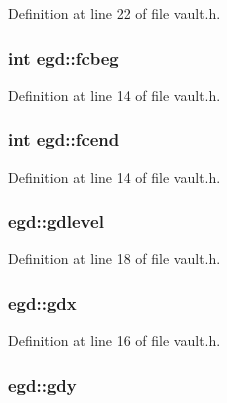 Definition at line 22 of file vault.\+h.

\hypertarget{structegd_ac76b1fc679788ec57bf0a1daa904967f}{
\subsubsection[{fcbeg}]{\setlength{\rightskip}{0pt plus 5cm}int egd\+::fcbeg}}\label{structegd_ac76b1fc679788ec57bf0a1daa904967f}


Definition at line 14 of file vault.\+h.

\hypertarget{structegd_a7dfd1430e95e480db2b8229ab842ff0f}{
\subsubsection[{fcend}]{\setlength{\rightskip}{0pt plus 5cm}int egd\+::fcend}}\label{structegd_a7dfd1430e95e480db2b8229ab842ff0f}


Definition at line 14 of file vault.\+h.

\hypertarget{structegd_a47d146b6474b8554aa3150fd7ae3c03f}{
\subsubsection[{gdlevel}]{ egd\+::gdlevel}}\label{structegd_a47d146b6474b8554aa3150fd7ae3c03f}


Definition at line 18 of file vault.\+h.

\hypertarget{structegd_ac1a2fe4494596129ab2b4c077e4c2b4c}{
\subsubsection[{gdx}]{ egd\+::gdx}}\label{structegd_ac1a2fe4494596129ab2b4c077e4c2b4c}


Definition at line 16 of file vault.\+h.

\hypertarget{structegd_a30c8a3ece31c1b1459f7cdae076ec97e}{
\subsubsection[{gdy}]{ egd\+::gdy}}\label{structegd_a30c8a3ece31c1b1459f7cdae076ec97e}



